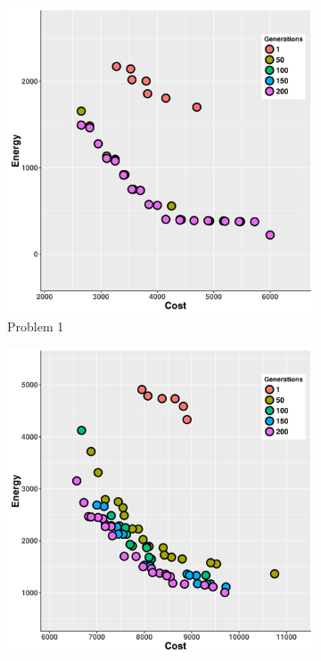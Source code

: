 \begin{figure}
   \centering
   \begin{subfigure}[b]{0.45\textwidth} \includegraphics[width=\textwidth]{pics/preliminary/without/testCase1_.png}
   \caption{Problem 1}
   \label{fig:a}
   \end{subfigure}
   \begin{subfigure}[b]{0.45\textwidth} \includegraphics[width=\textwidth]{pics/preliminary/without/testCase2_.png}

\end{subfigure}
\end{figure}
